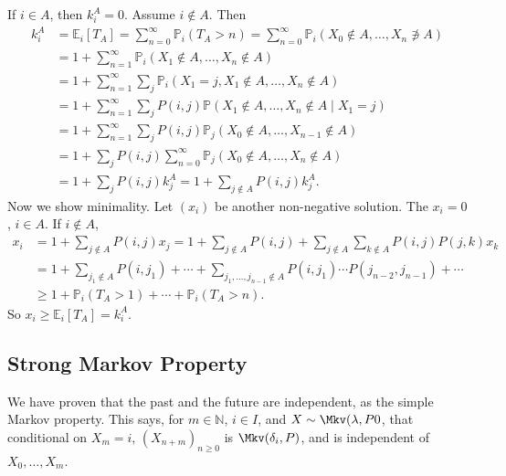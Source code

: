 \documentclass[12pt]{article}
\begin{document}
\begin{proofbox}
	If $i \in A$, then $k_i^{A} = 0$. Assume $i \not \in A$. Then
\begin{align*}
	k_i^{A} &= \mathbb{E}_i[T_A] = \sum_{n = 0}^{\infty} \mathbb{P}_i (T_A > n) = \sum_{n = 0}^{\infty}\mathbb{P}_i(X_0 \not \in A, \ldots, X_n \not \ni A) \\
		&= 1 + \sum_{n = 1}^{\infty} \mathbb{P}_i(X_1 \not \in A, \ldots, X_n \not \in A) \\
		&= 1 + \sum_{n = 1}^{\infty} \sum_{j} \mathbb{P}_i(X_1 = j, X_1 \not \in A, \ldots, X_n \not \in A) \\
		&= 1 + \sum_{n = 1}^{\infty} \sum_{j} P(i, j) \mathbb{P}(X_1 \not \in A, \ldots, X_n \not \in A \mid X_1 = j) \\
		&= 1 + \sum_{n = 1}^{\infty} \sum_{j} P(i, j) \mathbb{P}_j(X_0 \not \in A, \ldots, X_{n-1} \not \in A) \\
		&= 1 + \sum_{j} P(i, j) \sum_{n = 0}^{\infty} \mathbb{P}_j(X_0 \not \in A, \ldots, X_n \not \in A) \\
		&= 1 + \sum_{j}P(i,j) k_j^{A} = 1 + \sum_{j \not \in A}P(i, j) k_{j}^{A}.
\end{align*}
Now we show minimality. Let $(x_i)$ be another non-negative solution. The $x_i = 0$, $i \in A$. If $i \not \in A$,
\begin{align*}
	x_i &= 1 + \sum_{j \not \in A}P(i, j) x_j = 1 + \sum_{j \not \in A}P(i, j) + \sum_{j \not \in A}\sum_{k \not \in A}P(i, j) P(j, k) x_k \\
	    &=1 + \sum_{j_1 \not \in A}P(i, j_1) + \cdots + \sum_{j_1, \ldots, j_{n-1} \not \in A} P(i, j_1) \cdots P(j_{n-2}, j_{n-1}) + \cdots \\
	    &\geq 1 + \mathbb{P}_i(T_A > 1) + \cdots + \mathbb{P}_i(T_A > n).
\end{align*}
So $x_i \geq \mathbb{E}_i[T_A] = k_i^{A}$.
\end{proofbox}

\subsection{Strong Markov Property}%
\label{sub:strong_markov_property}

We have proven that the past and the future are independent, as the simple Markov property. This says, for $m \in \mathbb{N}$, $i \in I$, and $X \sim \Mkv(\lambda, P0$, that conditional on $X_m = i$, $(X_{n+m})_{n \geq 0}$ is $\Mkv(\delta_i, P)$, and is independent of $X_0, \ldots, X_m$.
\end{document}
